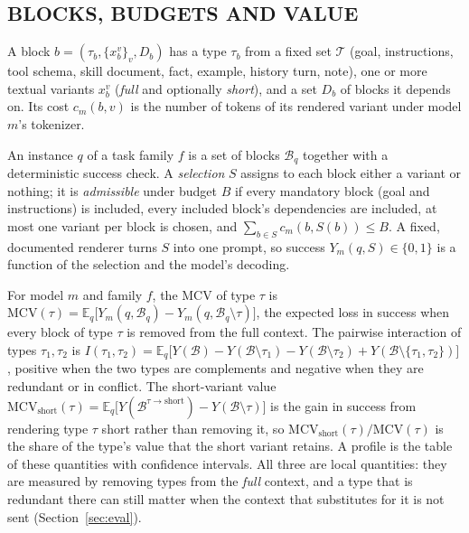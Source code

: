 
\subsection{BLOCKS, BUDGETS AND VALUE}
\begin{definition}\label{def:block}
A block $b=(\tau_b,\{x_b^v\}_v,D_b)$ has a type $\tau_b$ from a fixed set $\mathcal{T}$ (goal, instructions, tool schema,
skill document, fact, example, history turn, note), one or more textual variants $x_b^v$ (\emph{full} and optionally
\emph{short}), and a set $D_b$ of blocks it depends on. Its cost $c_m(b,v)$ is the number of tokens of its rendered variant
under model $m$'s tokenizer.
\end{definition}

An instance $q$ of a task family $f$ is a set of blocks $\mathcal{B}_q$ together with a deterministic success check. A
\emph{selection} $S$ assigns to each block either a variant or nothing; it is \emph{admissible} under budget $B$ if every
mandatory block (goal and instructions) is included, every included block's dependencies are included, at most one
variant per block is chosen, and $\sum_{b\in S} c_m(b,S(b))\le B$. A fixed, documented renderer turns $S$ into one prompt,
so success $Y_m(q,S)\in\{0,1\}$ is a function of the selection and the model's decoding.

\begin{definition}\label{def:mcv}
For model $m$ and family $f$, the MCV of type $\tau$ is
$\mathrm{MCV}(\tau)=\mathbb{E}_q\big[Y_m(q,\mathcal{B}_q)-Y_m(q,\mathcal{B}_q\setminus\tau)\big]$,
the expected loss in success when every block of type $\tau$ is removed from the full context. The pairwise interaction
of types $\tau_1,\tau_2$ is
$I(\tau_1,\tau_2)=\mathbb{E}_q\big[Y(\mathcal{B})-Y(\mathcal{B}\setminus\tau_1)-Y(\mathcal{B}\setminus\tau_2)+
Y(\mathcal{B}\setminus\{\tau_1,\tau_2\})\big]$,
positive when the two types are complements and negative when they are redundant or in conflict. The short-variant value
$\mathrm{MCV}_{\mathrm{short}}(\tau)=\mathbb{E}_q\big[Y(\mathcal{B}^{\tau\to\mathrm{short}})-Y(\mathcal{B}\setminus\tau)\big]$
is the gain in success from rendering type $\tau$ short rather than removing it, so
$\mathrm{MCV}_{\mathrm{short}}(\tau)/\mathrm{MCV}(\tau)$ is the share of the type's value that the short variant retains.
A profile is the table of these quantities with confidence intervals. All three are local quantities: they are measured
by removing types from the \emph{full} context, and a type that is redundant there can still matter when the context
that substitutes for it is not sent (Section~\ref{sec:eval}).
\end{definition}

